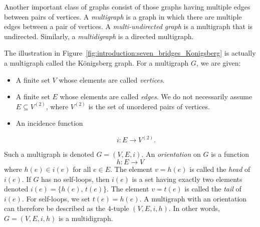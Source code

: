 Another important class of graphs consist of those graphs having
multiple edges between pairs of vertices. A \emph{multigraph} is a
graph in which there are multiple edges between a pair of vertices. A
\emph{multi-undirected graph} is a multigraph that is
undirected. Similarly, a \emph{multidigraph} is a directed
multigraph.

The illustration in
Figure~\ref{fig:introduction:seven_bridges_Konigsberg} is actually a
multigraph called the K\"onigsberg graph. For a multigraph $G$, we are
given:
%
\begin{itemize}
\item A finite set $V$ whose elements are called \emph{vertices}.

\item A finite set $E$ whose elements are called \emph{edges}. We do
  not necessarily assume $E \subseteq V^{(2)}$, where $V^{(2)}$ is the
  set of unordered pairs of vertices.

\item An incidence function

\begin{equation}
\label{eqn:edge-incidence}
i: E \longrightarrow V^{(2)}.
\end{equation}
\end{itemize}
%
Such a multigraph is denoted $G = (V,E,i)$. An \emph{orientation} on
$G$ is a function
%
\begin{equation}
\label{eqn:edge-orientation}
h: E \longrightarrow V
\end{equation}
%
where $h(e) \in i(e)$ for all $e \in E$. The element $v = h(e)$ is
called the \emph{head} of $i(e)$. If $G$ has no self-loops, then
$i(e)$ is a set having exactly two elements denoted
$i(e) = \{h(e),\, t(e)\}$. The element $v = t(e)$ is called the
\emph{tail} of $i(e)$. For self-loops, we set $t(e) = h(e)$. A
multigraph with an orientation can therefore be described as the
$4$-tuple $(V, E, i, h)$. In other words, $G = (V,E,i,h)$ is a
multidigraph.

